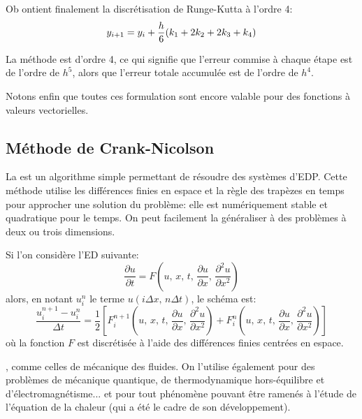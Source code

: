 \medskip
Ob ontient finalement la discrétisation de Runge-Kutta à l'ordre 4:
\begin{equation}
y_{i+1} = y_i + {h \over 6} (k_1 + 2k_2 + 2k_3 + k_4) 
\end{equation}

\medskip
La méthode est d'ordre 4, ce qui signifie que l'erreur commise à chaque étape 
est de l'ordre de $h^5$, alors que l'erreur totale accumulée est de l'ordre de $h^4$.

\medskip
Notons enfin que toutes ces formulation sont encore valable pour des fonctions à
valeurs vectorielles.



\medskip
\subsection{Méthode de Crank-Nicolson}

La  
est un algorithme simple permettant de résoudre des systèmes d'EDP. 
Cette méthode utilise les différences finies en espace et la règle des trapèzes en temps pour approcher une solution du problème: 
elle est numériquement stable et quadratique pour le temps. 
On peut facilement la généraliser à des problèmes à deux ou trois dimensions.

\medskip
Si l'on considère l'ED suivante:
\begin{equation}
    \frac{\partial u}{\partial t} = F\left(u,\, x,\, t,\, \frac{\partial u}{\partial x},\, \frac{\partial^2 u}{\partial x^2}\right)
\end{equation}
alors, en notant $u_{i}^{n}$ le terme $u(i \Delta x,\, n \Delta t)$, le schéma est:
\begin{equation}
    \frac{u_{i}^{n + 1} - u_{i}^{n}}{\Delta t} = \frac{1}{2}\left[ F_{i}^{n + 1}\left(u,\, x,\, t,\, \frac{\partial u}{\partial x},\, \frac{\partial^2 u}{\partial x^2}\right) + F_{i}^{n}\left(u,\, x,\, t,\, \frac{\partial u}{\partial x},\, \frac{\partial^2 u}{\partial x^2}\right) \right]
\end{equation}
où la fonction $F$ est discrétisée à l'aide des différences finies centrées en espace.

\medskip
{}, comme celles de mécanique des fluides.
On l'utilise également pour des problèmes de mécanique quantique, de thermodynamique hors-équilibre
et d'électromagnétisme... et pour tout phénomène pouvant être ramenés à l'étude de l'équation de la chaleur
(qui a été le cadre de son développement).

